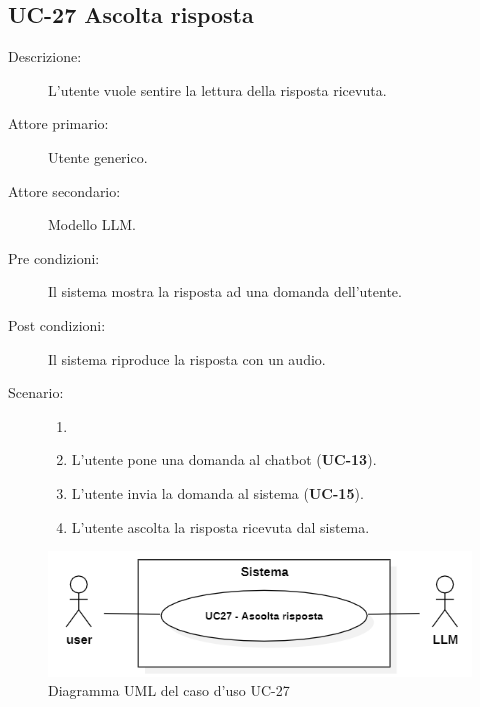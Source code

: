 \subsection{UC-27 Ascolta risposta}
\begin{description}
    \item[Descrizione:] L'utente vuole sentire la lettura della risposta ricevuta.
    \item[Attore primario:] Utente generico.
    \item[Attore secondario:] Modello LLM.
    \item[Pre condizioni:] Il sistema mostra la risposta ad una domanda dell'utente.
    \item[Post condizioni:] Il sistema riproduce la risposta con un audio.
    \item[Scenario:]
    \begin{enumerate}
        \item[]
        \item L’utente pone una domanda al chatbot (\textbf{UC-13}).
        \item L'utente invia la domanda al sistema (\textbf{UC-15}).
        \item L'utente ascolta la risposta ricevuta dal sistema.
    \end{enumerate}
\end{description}

\begin{figure}[H]
    \centering
    \includegraphics[width=0.9\linewidth]{UC27.png} %
    \caption{Diagramma UML del caso d'uso UC-27}
    \label{fig:UC33}
\end{figure}
